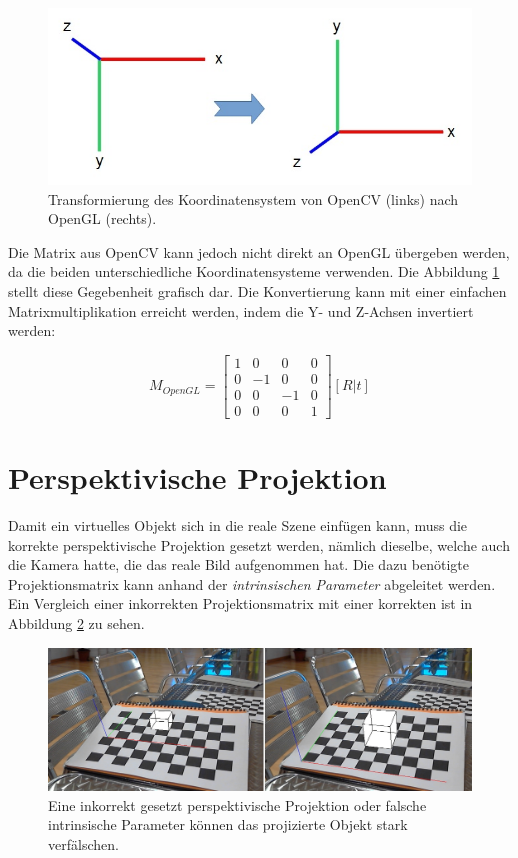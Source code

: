 \begin{figure}[!ht]
\centering
\includegraphics[scale=0.5]{images/opencv-to-opengl.jpg} 
\caption{Transformierung des Koordinatensystem von OpenCV (links) nach OpenGL (rechts).}
\label{fig:opencv-to-opengl}
\end{figure}


Die Matrix aus OpenCV kann jedoch nicht direkt an OpenGL übergeben werden, da die beiden unterschiedliche Koordinatensysteme verwenden. Die Abbildung \ref{fig:opencv-to-opengl} stellt diese Gegebenheit grafisch dar. Die Konvertierung kann mit einer einfachen Matrixmultiplikation erreicht werden, indem die Y- und Z-Achsen invertiert werden:

\begin{equation}
M_{OpenGL}
=
\begin{bmatrix}
1 & 0 & 0 & 0 \\
0 & -1 & 0 & 0 \\
0 & 0 & -1 & 0 \\
0 & 0 & 0 & 1
\end{bmatrix} 
[R | t]
\end{equation}

 
\section{Perspektivische Projektion}

Damit ein virtuelles Objekt sich in die reale Szene einfügen kann, muss die korrekte perspektivische Projektion gesetzt werden, nämlich dieselbe, welche auch die Kamera hatte, die das reale Bild aufgenommen hat. Die dazu benötigte Projektionsmatrix kann anhand der \textit{intrinsischen Parameter} abgeleitet werden. Ein Vergleich einer inkorrekten Projektionsmatrix mit einer korrekten ist in Abbildung \ref{fig:opengl-perspektive} zu sehen.


\begin{figure}[!ht]
\centering
\includegraphics[scale=0.5]{images/opengl-perspective.jpg} 
\caption{Eine inkorrekt gesetzt perspektivische Projektion oder falsche intrinsische Parameter können das projizierte Objekt stark verfälschen.}
\label{fig:opengl-perspektive}
\end{figure}


